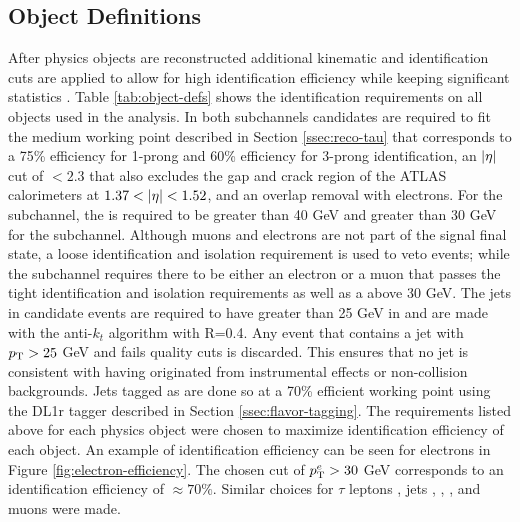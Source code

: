 		\subsection{Object Definitions}\label{ssec:object-def}
			After physics objects are reconstructed additional kinematic and identification cuts are applied to allow for high identification efficiency while keeping significant statistics \cites{tau-id-rnn}{jet-calibration}{b-tagging}{electron-perf}{muon-id}. Table \ref{tab:object-defs} shows the identification requirements on all objects used in the analysis. In both subchannels \tauhad candidates are required to fit the medium working point described in Section \ref{ssec:reco-tau} that corresponds to a 75\% efficiency for 1-prong and 60\% efficiency for 3-prong \tauhad identification, an $|{\eta}|$ cut of $< 2.3$ that also excludes the gap and crack region of the ATLAS calorimeters at $1.37 < |{\eta}| < 1.52$, and an overlap removal with electrons. For the \taujets subchannel, the \tauhad \pt is required to be greater than 40 GeV and greater than 30 GeV for the \taulep subchannel. Although muons and electrons are not part of the \taujets signal final state, a loose identification and isolation requirement is used to veto events; while the \taulep subchannel requires there to be either an electron or a muon that passes the tight identification and isolation requirements as well as a \pt above 30 GeV. The jets in candidate events are required to have greater than 25 GeV in \pt and are made with the anti-$k_t$ algorithm with R=0.4. Any event that contains a jet with $p_{\text{T}} > 25$ GeV and fails quality cuts is discarded. This ensures that no jet is consistent with having originated from instrumental effects or non-collision backgrounds. Jets tagged as \bjets are done so at a 70\% efficient working point using the DL1r tagger described in Section \ref{ssec:flavor-tagging}. The \pt requirements listed above for each physics object were chosen to maximize identification efficiency of each object. An example of identification efficiency can be seen for electrons in Figure \ref{fig:electron-efficiency}. The chosen cut of $p_{\text{T}}^{e}>30$ GeV corresponds to an identification efficiency of $\approx 70\%$. Similar choices for $\tau$ leptons \cite{tau-id-rnn}, jets \cite{jet-calibration}, \bjets \cite{b-tagging}, \Etm \cite{met-perf}, and muons \cite{muon-calibration} were made. 

